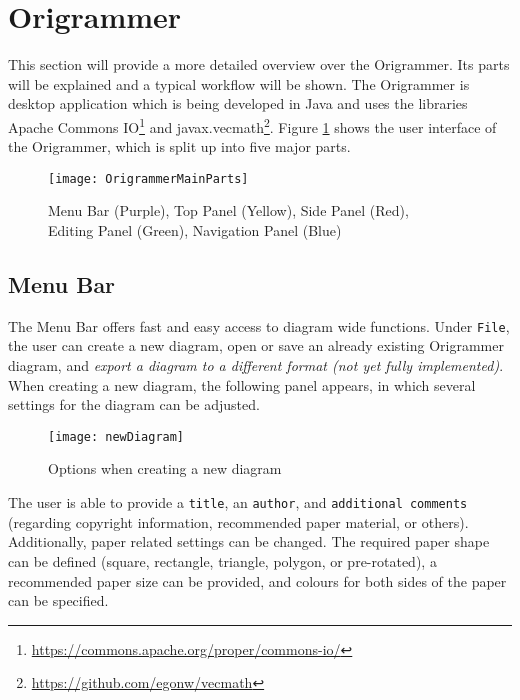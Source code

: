 
\section{Origrammer}
\label{sec:origrammer}

This section will provide a more detailed overview over the Origrammer. Its parts will be explained and a typical workflow will be shown. The Origrammer is desktop application which is being developed in Java and uses the libraries Apache Commons IO\footnote{\url{https://commons.apache.org/proper/commons-io/}} and javax.vecmath\footnote{\url{https://github.com/egonw/vecmath}}. Figure \ref{fig:origrammerMain} shows the user interface of the Origrammer, which is split up into five major parts.

\begin{figure}[htbp]
	\centering
	\texttt{[image: OrigrammerMainParts]}
	\caption{Menu Bar (Purple), Top Panel (Yellow), Side Panel (Red),\\ Editing Panel (Green), Navigation Panel (Blue)}
	\label{fig:origrammerMain}
\end{figure}

\subsection{Menu Bar}

The Menu Bar offers fast and easy access to diagram wide functions. Under \texttt{File}, the user can create a new diagram, open or save an already existing Origrammer diagram, and \emph{export a diagram to a different format (not yet fully implemented)}. When creating a new diagram, the following panel appears, in which several settings for the diagram can be adjusted.

\begin{figure}[htbp]
	\centering
	\texttt{[image: newDiagram]}
	\caption{Options when creating a new diagram}
	\label{fig:newDiagram}
\end{figure}

\newpage
\noindent The user is able to provide a \texttt{title}, an \texttt{author}, and \texttt{additional comments} (regarding copyright information, recommended paper material, or others). Additionally, paper related settings can be changed. The required paper shape can be defined (square, rectangle, triangle, polygon, or pre-rotated), a recommended paper size can be provided, and colours for both sides of the paper can be specified.


